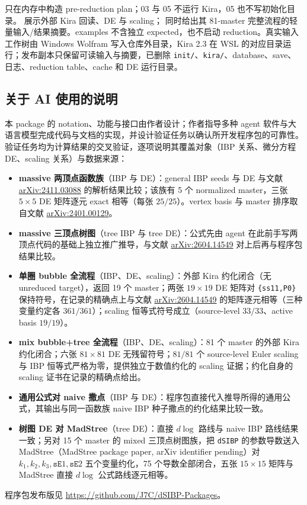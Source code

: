 ﻿\documentclass[a4paper,11pt]{article}
\begin{document}
 只在内存中构造 pre-reduction plan；03 与 05 不运行 Kira，05 也不写初始化目录。 展示外部 Kira 回读、DE 与 scaling； 同时给出其 81-master 完整流程的轻量输入/结果摘要。examples 不含独立 expected，也不启动 reduction。真实输入工作树由 Windows Wolfram 写入仓库外目录，Kira 2.3 在 WSL 的对应目录运行；发布副本只保留可读输入与摘要，已删除 \texttt{init/}、\texttt{kira/}、database、save、日志、reduction table、cache 和 DE 运行目录。

\subsection*{关于 AI 使用的说明}
本 package 的 notation、功能与接口由作者设计；作者指导多种 agent 软件与大语言模型完成代码与文档的实现，并设计验证任务以确认所开发程序包的可靠性。验证任务均为计算结果的交叉验证，逐项说明其覆盖对象（IBP 关系、微分方程 DE、scaling 关系）与数据来源：
\begin{itemize}
  \item \textbf{massive 两顶点函数族}（IBP 与 DE）：general IBP seeds 与 DE 与文献
    \href{https://arxiv.org/abs/2411.03088}{arXiv:2411.03088} 的解析结果比较；该族有 5 个 normalized master，三张 $5\times5$ DE 矩阵逐元 exact 相等（每张 $25/25$）。vertex basis 与 master 排序取自文献
    \href{https://arxiv.org/abs/2401.00129}{arXiv:2401.00129}。
  \item \textbf{massive 三顶点树图}（tree IBP 与 tree DE）：公式先由 agent 在此前手写两顶点代码的基础上独立推广推导，与文献
    \href{https://arxiv.org/abs/2604.14549}{arXiv:2604.14549} 对上后再与程序包结果比较。
  \item \textbf{单圈 bubble 全流程}（IBP、DE、scaling）：外部 Kira 约化闭合（无 unreduced target），返回 19 个 master；两张 $19\times19$ DE 矩阵对 \texttt{\{ss11,P0\}} 保持符号，在记录的精确点上与文献
    \href{https://arxiv.org/abs/2604.14549}{arXiv:2604.14549} 的矩阵逐元相等（三种变量约定各 $361/361$）；scaling 恒等式符号成立（source-level $33/33$、active basis $19/19$）。
  \item \textbf{mix bubble+tree 全流程}（IBP、DE、scaling）：81 个 master 的外部 Kira 约化闭合；六张 $81\times81$ DE 无残留符号；$81/81$ 个 source-level Euler scaling 与 IBP 恒等式严格为零，提供独立于数值约化的 scaling 证据；约化自身的 scaling 证书在记录的精确点给出。
  \item \textbf{通用公式对 naive 撒点}（IBP 与 DE）：程序包直接代入推导所得的通用公式，其输出与同一函数族 naive IBP 种子撒点的约化结果比较一致。
  \item \textbf{树图 DE 对 MadStree}（tree DE）：直接 $d\log$ 路线与 naive IBP 路线结果一致；另对 15 个 master 的 mixed 三顶点树图族，把 \texttt{dSIBP} 的参数导数送入 MadStree（MadStree package paper, arXiv identifier pending）对 $k_1,k_2,k_3,\texttt{sE}1,\texttt{sE}2$ 五个变量约化，75 个导数全部闭合，五张 $15\times15$ 矩阵与 MadStree 直接 $d\log$ 公式路线逐元相等。
\end{itemize}
程序包发布版见 \url{https://github.com/J7C/dSIBP-Packages}。
\end{document}
